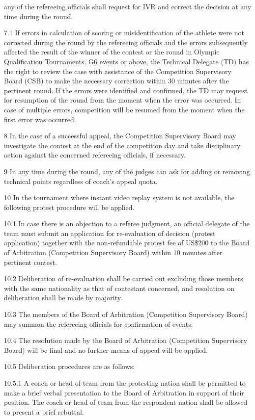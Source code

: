 \documentclass[
]{report}
\begin{document}
any of the refereeing officials shall request for IVR and correct the
decision at any time during the round.

7.1 If errors in calculation of scoring or misidentification of the
athlete were not corrected during the round by the refereeing officials
and the errors subsequently affected the result of the winner of the
contest or the round in Olympic Qualification Tournaments, G6 events or
above, the Technical Delegate (TD) has the right to review the case with
assistance of the Competition Supervisory Board (CSB) to make the
necessary correction within 30 minutes after the pertinent round. If the
errors were identified and confirmed, the TD may request for resumption
of the round from the moment when the error was occurred. In case of
multiple errors, competition will be resumed from the moment when the
first error was occurred.

8 In the case of a successful appeal, the Competition Supervisory Board
may investigate the contest at the end of the competition day and take
disciplinary action against the concerned refereeing officials, if
necessary.

9 In any time during the round, any of the judges can ask for adding or
removing technical points regardless of coach's appeal quota.

10 In the tournament where instant video replay system is not available,
the following protest procedure will be applied.

10.1 In case there is an objection to a referee judgment, an official
delegate of the team must submit an application for re-evaluation of
decision (protest application) together with the non-refundable protest
fee of US\$200 to the Board of Arbitration (Competition Supervisory
Board) within 10 minutes after pertinent contest.

10.2 Deliberation of re-evaluation shall be carried out excluding those
members with the same nationality as that of contestant concerned, and
resolution on deliberation shall be made by majority.

10.3 The members of the Board of Arbitration (Competition Supervisory
Board) may summon the refereeing officials for confirmation of events.

10.4 The resolution made by the Board of Arbitration (Competition
Supervisory Board) will be final and no further means of appeal will be
applied.

10.5 Deliberation procedures are as follows:

10.5.1 A coach or head of team from the protesting nation shall be
permitted to make a brief verbal presentation to the Board of
Arbitration in support of their position. The coach or head of team from
the respondent nation shall be allowed to present a brief rebuttal.
\end{document}
